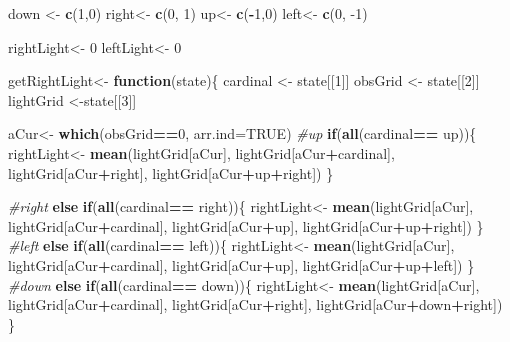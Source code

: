 \documentclass[]{article}
\newenvironment{Shaded}{\begin{snugshade}}{\end{snugshade}}
\newcommand{\CommentTok}[1]{\textcolor[rgb]{0.56,0.35,0.01}{\textit{#1}}}
\newcommand{\ControlFlowTok}[1]{\textcolor[rgb]{0.13,0.29,0.53}{\textbf{#1}}}
\newcommand{\DataTypeTok}[1]{\textcolor[rgb]{0.13,0.29,0.53}{#1}}
\newcommand{\DecValTok}[1]{\textcolor[rgb]{0.00,0.00,0.81}{#1}}
\newcommand{\KeywordTok}[1]{\textcolor[rgb]{0.13,0.29,0.53}{\textbf{#1}}}
\newcommand{\NormalTok}[1]{#1}
\newcommand{\OperatorTok}[1]{\textcolor[rgb]{0.81,0.36,0.00}{\textbf{#1}}}
\newcommand{\OtherTok}[1]{\textcolor[rgb]{0.56,0.35,0.01}{#1}}
\newcommand{\StringTok}[1]{\textcolor[rgb]{0.31,0.60,0.02}{#1}}
\begin{document}
\begin{Shaded}
\begin{Highlighting}[]
\NormalTok{down <-}\StringTok{ }\KeywordTok{c}\NormalTok{(}\DecValTok{1}\NormalTok{,}\DecValTok{0}\NormalTok{)}
\NormalTok{right<-}\StringTok{ }\KeywordTok{c}\NormalTok{(}\DecValTok{0}\NormalTok{, }\DecValTok{1}\NormalTok{)}
\NormalTok{up<-}\StringTok{ }\KeywordTok{c}\NormalTok{(}\OperatorTok{-}\DecValTok{1}\NormalTok{,}\DecValTok{0}\NormalTok{)}
\NormalTok{left<-}\StringTok{ }\KeywordTok{c}\NormalTok{(}\DecValTok{0}\NormalTok{, }\DecValTok{-1}\NormalTok{)}

\NormalTok{rightLight<-}\StringTok{ }\DecValTok{0}
\NormalTok{leftLight<-}\StringTok{ }\DecValTok{0}

\NormalTok{getRightLight<-}\StringTok{ }\ControlFlowTok{function}\NormalTok{(state)\{}
\NormalTok{  cardinal <-}\StringTok{ }\NormalTok{state[[}\DecValTok{1}\NormalTok{]]}
\NormalTok{  obsGrid <-}\StringTok{ }\NormalTok{state[[}\DecValTok{2}\NormalTok{]]}
\NormalTok{  lightGrid <-state[[}\DecValTok{3}\NormalTok{]]}
  
\NormalTok{  aCur<-}\StringTok{ }\KeywordTok{which}\NormalTok{(obsGrid}\OperatorTok{==}\DecValTok{0}\NormalTok{, }\DataTypeTok{arr.ind=}\OtherTok{TRUE}\NormalTok{)}
  \CommentTok{#up}
  \ControlFlowTok{if}\NormalTok{(}\KeywordTok{all}\NormalTok{(cardinal}\OperatorTok{==}\StringTok{ }\NormalTok{up))\{}
\NormalTok{    rightLight<-}\StringTok{ }\KeywordTok{mean}\NormalTok{(lightGrid[aCur], lightGrid[aCur}\OperatorTok{+}\NormalTok{cardinal], lightGrid[aCur}\OperatorTok{+}\NormalTok{right], lightGrid[aCur}\OperatorTok{+}\NormalTok{up}\OperatorTok{+}\NormalTok{right])}
\NormalTok{       \}}
  
  \CommentTok{#right}
  \ControlFlowTok{else} \ControlFlowTok{if}\NormalTok{(}\KeywordTok{all}\NormalTok{(cardinal}\OperatorTok{==}\StringTok{ }\NormalTok{right))\{}
\NormalTok{      rightLight<-}\StringTok{ }\KeywordTok{mean}\NormalTok{(lightGrid[aCur], lightGrid[aCur}\OperatorTok{+}\NormalTok{cardinal], lightGrid[aCur}\OperatorTok{+}\NormalTok{up], lightGrid[aCur}\OperatorTok{+}\NormalTok{up}\OperatorTok{+}\NormalTok{right])}
\NormalTok{       \}}
  \CommentTok{#left}
    \ControlFlowTok{else} \ControlFlowTok{if}\NormalTok{(}\KeywordTok{all}\NormalTok{(cardinal}\OperatorTok{==}\StringTok{ }\NormalTok{left))\{}
\NormalTok{    rightLight<-}\StringTok{ }\KeywordTok{mean}\NormalTok{(lightGrid[aCur], lightGrid[aCur}\OperatorTok{+}\NormalTok{cardinal], lightGrid[aCur}\OperatorTok{+}\NormalTok{up], lightGrid[aCur}\OperatorTok{+}\NormalTok{up}\OperatorTok{+}\NormalTok{left])}
\NormalTok{      \}}
  \CommentTok{#down}
    \ControlFlowTok{else} \ControlFlowTok{if}\NormalTok{(}\KeywordTok{all}\NormalTok{(cardinal}\OperatorTok{==}\StringTok{ }\NormalTok{down))\{}
\NormalTok{    rightLight<-}\StringTok{ }\KeywordTok{mean}\NormalTok{(lightGrid[aCur], lightGrid[aCur}\OperatorTok{+}\NormalTok{cardinal], lightGrid[aCur}\OperatorTok{+}\NormalTok{right], lightGrid[aCur}\OperatorTok{+}\NormalTok{down}\OperatorTok{+}\NormalTok{right])}
\NormalTok{     \}}
  

\end{Highlighting}
\end{Shaded}
\end{document}
